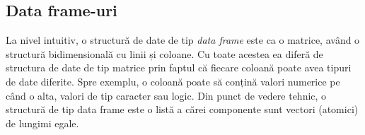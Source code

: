 \documentclass[]{article}
\newenvironment{Shaded}{\begin{snugshade}}{\end{snugshade}}
\newcommand{\KeywordTok}[1]{\textcolor[rgb]{0.13,0.29,0.53}{\textbf{#1}}}
\newcommand{\DataTypeTok}[1]{\textcolor[rgb]{0.13,0.29,0.53}{#1}}
\newcommand{\DecValTok}[1]{\textcolor[rgb]{0.00,0.00,0.81}{#1}}
\newcommand{\StringTok}[1]{\textcolor[rgb]{0.31,0.60,0.02}{#1}}
\newcommand{\OtherTok}[1]{\textcolor[rgb]{0.56,0.35,0.01}{#1}}
\newcommand{\OperatorTok}[1]{\textcolor[rgb]{0.81,0.36,0.00}{\textbf{#1}}}
\newcommand{\ErrorTok}[1]{\textcolor[rgb]{0.64,0.00,0.00}{\textbf{#1}}}
\newcommand{\NormalTok}[1]{#1}
\begin{document}
\begin{Shaded}
\end{Shaded}

\subsection{Data frame-uri}\label{data-frame-uri}

La nivel intuitiv, o structură de date de tip \emph{data frame} este ca
o matrice, având o structură bidimensională cu linii și coloane. Cu
toate acestea ea diferă de structura de date de tip matrice prin faptul
că fiecare coloană poate avea tipuri de date diferite. Spre exemplu, o
coloană poate să conțină valori numerice pe când o alta, valori de tip
caracter sau logic. Din punct de vedere tehnic, o structură de tip data
frame este o listă a cărei componente sunt vectori (atomici) de lungimi
egale.
\end{document}
